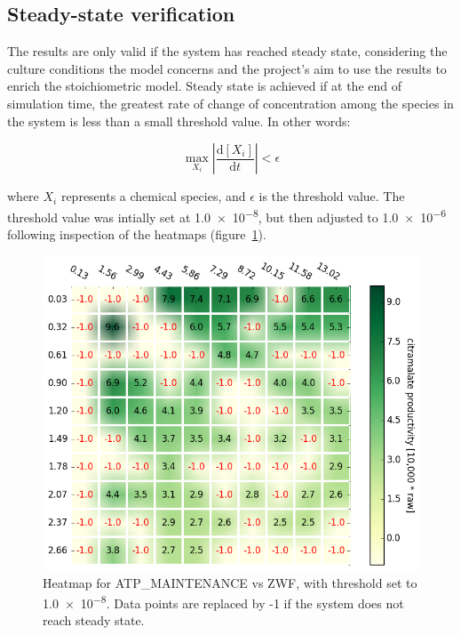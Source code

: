 \documentclass[parskip=full, numbers=noenddot]{scrreprt}
\begin{document}
\subsection{Steady-state verification}
\label{ssec:steadystate}

The results are only valid if the system has reached steady state, considering the culture conditions the model concerns and the project's aim to use the results to enrich the stoichiometric model. Steady state is achieved if at the end of simulation time, the greatest rate of change of concentration among the species in the system is less than a small threshold value. In other words:

\begin{equation}
  \max_{X_{i}} \left | \frac{\mathrm{d}[X_{i}]}{\mathrm{d}t} \right | < \epsilon
\end{equation}
\label{eqn:steadystate}

where $X_{i}$ represents a chemical species, and $\epsilon$ is the threshold value. The threshold value was intially set at \num{1.0e-8}, but then adjusted to \num{1.0e-6} following inspection of the heatmaps (figure~\ref{fig:steadystate}).

\begin{figure}[hbp]
  \centering
  \includegraphics[scale=0.5]{steadystate}
  \caption{Heatmap for ATP\_MAINTENANCE vs ZWF, with threshold set to \num{1.0e-8}. Data points are replaced by -1 if the system does not reach steady state.}
  \label{fig:steadystate}
\end{figure}
\end{document}
